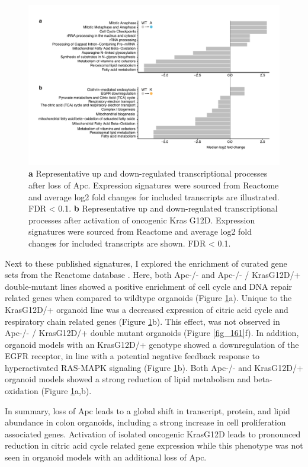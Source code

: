 \begin{flushleft}
 \begin{figure}[h]
\centering
\includegraphics[width=\textwidth,
                height=\textheight,
                keepaspectratio]{figures/adenomaprofiling/pdf/fig_1_6_2.pdf}
\caption{
\textbf{a} Representative up and down-regulated transcriptional processes after loss of Apc. Expression signatures were sourced from Reactome and average log2 fold changes for included transcripts are illustrated. FDR < 0.1.
\textbf{b} Representative up and down-regulated transcriptional processes after activation of oncogenic Kras G12D. Expression signatures were sourced from Reactome and average log2 fold changes for included transcripts are shown. FDR < 0.1.
}
\label{fig_162}
\end{figure}
\bigbreak


Next to these published signatures, I explored the enrichment of curated gene sets from the Reactome database \cite{Griss2020-qi}. Here, both Apc-/- and Apc-/- / KrasG12D/+ double-mutant lines showed a positive enrichment of cell cycle and DNA repair related genes when compared to wildtype organoids (Figure \ref{fig_162}a). Unique to the KrasG12D/+ organoid line was a decreased expression of citric acid cycle and respiratory chain related genes (Figure \ref{fig_162}b). This effect, was not observed in Apc-/- / KrasG12D/+ double mutant organoids (Figure \ref{fig_161}f). In addition, organoid models with an KrasG12D/+ genotype showed a downregulation of the EGFR receptor, in line with a potential negative feedback response to hyperactivated RAS-MAPK signaling (Figure \ref{fig_162}b). Both Apc-/- and KrasG12D/+ organoid models showed a strong reduction of lipid metabolism and beta-oxidation (Figure \ref{fig_162}a,b).

\smallbreak
In summary, loss of Apc leads to a global shift in transcript, protein, and lipid abundance in colon organoids, including a strong increase in cell proliferation associated genes. Activation of isolated oncogenic KrasG12D leads to pronounced reduction in citric acid cycle related gene expression while this phenotype was not seen in organoid models with an additional loss of Apc.


\end{flushleft}
